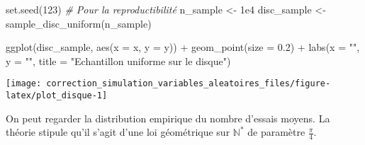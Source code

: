 \documentclass[
]{article}
\newenvironment{Shaded}{\begin{snugshade}}{\end{snugshade}}
\newcommand{\AttributeTok}[1]{\textcolor[rgb]{0.77,0.63,0.00}{#1}}
\newcommand{\CommentTok}[1]{\textcolor[rgb]{0.56,0.35,0.01}{\textit{#1}}}
\newcommand{\DecValTok}[1]{\textcolor[rgb]{0.00,0.00,0.81}{#1}}
\newcommand{\FloatTok}[1]{\textcolor[rgb]{0.00,0.00,0.81}{#1}}
\newcommand{\FunctionTok}[1]{\textcolor[rgb]{0.00,0.00,0.00}{#1}}
\newcommand{\NormalTok}[1]{#1}
\newcommand{\OtherTok}[1]{\textcolor[rgb]{0.56,0.35,0.01}{#1}}
\newcommand{\SpecialCharTok}[1]{\textcolor[rgb]{0.00,0.00,0.00}{#1}}
\newcommand{\StringTok}[1]{\textcolor[rgb]{0.31,0.60,0.02}{#1}}
\newenvironment{Correction}%
  { \vspace{\baselineskip}\begin{mdframed}[backgroundcolor=my_green]}%
  {\end{mdframed}}
\begin{document}
\begin{Shaded}
\begin{Highlighting}[]
\FunctionTok{set.seed}\NormalTok{(}\DecValTok{123}\NormalTok{) }\CommentTok{\# Pour la reproductibilité}
\NormalTok{n\_sample }\OtherTok{\textless{}{-}} \FloatTok{1e4}
\NormalTok{disc\_sample }\OtherTok{\textless{}{-}} \FunctionTok{sample\_disc\_uniform}\NormalTok{(n\_sample)}
\end{Highlighting}
\end{Shaded}

\begin{Shaded}
\begin{Highlighting}[]
\FunctionTok{ggplot}\NormalTok{(disc\_sample, }\FunctionTok{aes}\NormalTok{(}\AttributeTok{x =}\NormalTok{ x, }\AttributeTok{y =}\NormalTok{ y)) }\SpecialCharTok{+}
  \FunctionTok{geom\_point}\NormalTok{(}\AttributeTok{size =} \FloatTok{0.2}\NormalTok{) }\SpecialCharTok{+}
  \FunctionTok{labs}\NormalTok{(}\AttributeTok{x =} \StringTok{""}\NormalTok{, }\AttributeTok{y =} \StringTok{""}\NormalTok{, }\AttributeTok{title =} \StringTok{"Echantillon uniforme sur le disque"}\NormalTok{)}
\end{Highlighting}
\end{Shaded}

\begin{center}\texttt{[image: correction\_simulation\_variables\_aleatoires\_files/figure-latex/plot\_disque-1]} \end{center}

\begin{Correction}
On peut regarder la distribution empirique du nombre d'essais moyens.
La théorie stipule qu'il s'agit d'une loi géométrique sur $\mathbb{N}^*$ de paramètre $\frac{\pi}{4}$.
\end{Correction}
\end{document}
